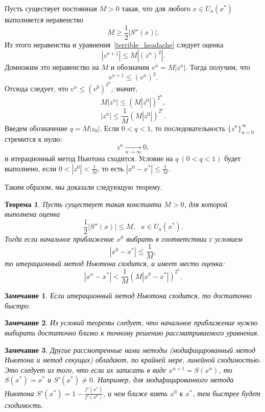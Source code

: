 \documentclass[11pt,a4paper,twoside]{report}
\numberwithin{equation}{section}
\theoremstyle{definition}
\theoremstyle{plain}
\newtheorem{theorem}{Теорема}[section]
\newtheorem{note}{Замечание}[section]
\begin{document}
Пусть существует постоянная $M > 0$ такая, что для любого $x \in U_a(x^*)$
выполняется неравенство
%
\begin{equation}
%
    \label{how_i_met_your_mother}
    M \geqslant \frac{1}{2}\left|S''(x)\right|.
%
\end{equation}
%
Из этого неравенства и уравнения~\eqref{terrible_headache} следует оценка
%
$$
    |z^{n+1}| \leqslant M|(z^n)^2|.
$$
%
Домножим это неравенство на $M$ и обозначим $v^n = M|z^n|$.
Тогда получим, что
%
\begin{equation}
%
    \label{big_bang_theory}
    v^{n+1} \leqslant (v^n)^2.
%
\end{equation}
%
Отсюда следует, что $v^n \leqslant (v^0)^{2^n}$, значит,
%
$$
    M|z^n| \leqslant \left(M\left|z^0\right|\right)^{2^n},
$$
%
%
$$
    |z^n| \leqslant \frac{1}{M} \left(M\left|z^0\right|\right)^{2^n}.
$$
%
Введем обозначение $q = M|z_0|$. Если $0< q < 1$,
то последовательность $\{z^n\}_{n=0}^\infty$ стремится к нулю:
%
$$
    z^n \underset{n\rightarrow\infty}\longrightarrow 0,
$$
%
и итерационный метод Ньютона сходится. Условие на $q~(0<q<1)$ будет выполнено,
если $0<|z^0|<\frac{1}{M}$, то есть $|x^0 - x^*| \leqslant \frac{1}{M}$.

\vspace{3mm}
Таким образом, мы доказали следующую теорему.
%
\begin{theorem}
%
    Пусть существует такая константа $M > 0$, для которой выполнена оценка
    $$
         \frac{1}{2}\left|S''(x)\right| \leqslant M, ~~~x \in U_a(x^*).
    $$
    Тогда если начальное приближение $x^0$ выбрать в соответствии с условием
    $$
        |x^0 - x^*| \leqslant \frac{1}{M},
    $$
    то итерационный метод Ньютона сходится, и имеет место оценка:
    $$
     |x^n - x^*| < \frac{1}{M}\left(M|x^0 - x^*|\right)^{2^n}.
    $$
%
\end{theorem}
%
%
\begin{note}
%
    Если итерационный метод Ньютона сходится, то достаточно быстро.
%
\end{note}
%
%
\begin{note}
%
    Из условий теоремы следует, что начальное приближение нужно выбирать
    достаточно близко к точному решению рассматриваемого уравнения.
%
\end{note}
%
%
\begin{note}
%
    Другие рассмотренные нами методы (модифицированный метод Ньютона и
    метод секущих) обладают, по крайней мере, линейной сходимостью. Это
    следует из того, что если их записать в виде $x^{n+1} = S(x^n)$, то
    $S(x^*) = x^*$ и $S'(x^*) \neq 0$. Например, для модифицированного
    метода Ньютона $S'(x^*) = 1 - \frac{f'(x^*)}{f'(x^0)}$, и чем ближе
    взять $x^0$ к $x^*$, тем быстрее будет сходимость.
\end{note}
%
\newpage
%
%
\end{document}
